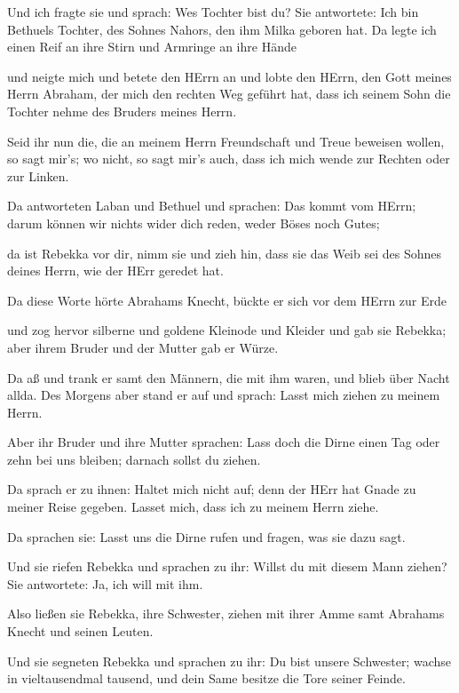  Und ich fragte sie und sprach: Wes Tochter bist du? Sie
antwortete: Ich bin Bethuels Tochter, des Sohnes Nahors, den ihm Milka
geboren hat. Da legte ich einen Reif an ihre Stirn und Armringe an ihre
Hände

 und neigte mich und betete den HErrn an und lobte den
HErrn, den Gott meines Herrn Abraham, der mich den rechten Weg geführt
hat, dass ich seinem Sohn die Tochter nehme des Bruders meines Herrn.

 Seid ihr nun die, die an meinem Herrn Freundschaft und
Treue beweisen wollen, so sagt mir's; wo nicht, so sagt mir's auch, dass
ich mich wende zur Rechten oder zur Linken.

 Da antworteten Laban und Bethuel und sprachen: Das kommt
vom HErrn; darum können wir nichts wider dich reden, weder Böses noch
Gutes;

 da ist Rebekka vor dir, nimm sie und zieh hin, dass sie
das Weib sei des Sohnes deines Herrn, wie der HErr geredet hat.

 Da diese Worte hörte Abrahams Knecht, bückte er sich vor
dem HErrn zur Erde

 und zog hervor silberne und goldene Kleinode und Kleider
und gab sie Rebekka; aber ihrem Bruder und der Mutter gab er Würze.

 Da aß und trank er samt den Männern, die mit ihm waren,
und blieb über Nacht allda. Des Morgens aber stand er auf und sprach:
Lasst mich ziehen zu meinem Herrn.

 Aber ihr Bruder und ihre Mutter sprachen: Lass doch die
Dirne einen Tag oder zehn bei uns bleiben; darnach sollst du ziehen.

 Da sprach er zu ihnen: Haltet mich nicht auf; denn der
HErr hat Gnade zu meiner Reise gegeben. Lasset mich, dass ich zu meinem
Herrn ziehe.

 Da sprachen sie: Lasst uns die Dirne rufen und fragen, was
sie dazu sagt.

 Und sie riefen Rebekka und sprachen zu ihr: Willst du mit
diesem Mann ziehen? Sie antwortete: Ja, ich will mit ihm.

 Also ließen sie Rebekka, ihre Schwester, ziehen mit ihrer
Amme samt Abrahams Knecht und seinen Leuten.

 Und sie segneten Rebekka und sprachen zu ihr: Du bist
unsere Schwester; wachse in vieltausendmal tausend, und dein Same
besitze die Tore seiner Feinde.

